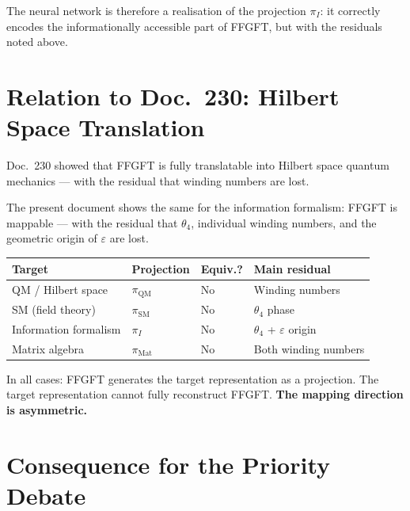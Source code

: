 The neural network is therefore a realisation of the projection $\pi_I$:
it correctly encodes the informationally accessible part of FFGFT,
but with the residuals noted above.

\section{Relation to Doc.~230: Hilbert Space Translation}

Doc.~230 showed that FFGFT is fully translatable into Hilbert space
quantum mechanics --- with the residual that winding numbers are lost.

The present document shows the same for the information formalism:
FFGFT is mappable --- with the residual that $\theta_4$, individual
winding numbers, and the geometric origin of $\varepsilon$ are lost.

\begin{center}
\renewcommand{\arraystretch}{1.3}
{\small
\begin{tabular}{p{4.5cm}p{2.5cm}p{1.5cm}p{4.5cm}}
\toprule
\textbf{Target} & \textbf{Projection} & \textbf{Equiv.?} & \textbf{Main residual} \\
\midrule
QM / Hilbert space & $\pi_\text{QM}$ & No & Winding numbers \\
SM (field theory) & $\pi_\text{SM}$ & No & $\theta_4$ phase \\
Information formalism & $\pi_I$ & No & $\theta_4$ + $\varepsilon$ origin \\
Matrix algebra & $\pi_\text{Mat}$ & No & Both winding numbers \\
\bottomrule
\end{tabular}
}
\end{center}

In all cases: FFGFT generates the target representation as a projection.
The target representation cannot fully reconstruct FFGFT.
\textbf{The mapping direction is asymmetric.}

\section{Consequence for the Priority Debate}

